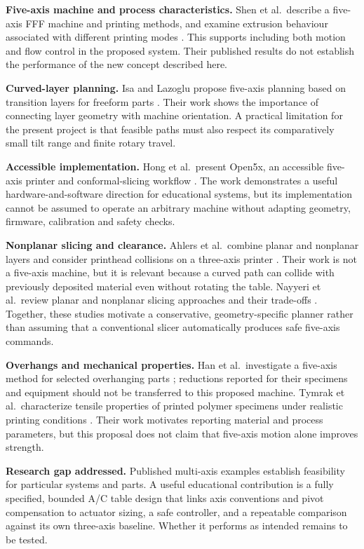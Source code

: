\documentclass[12pt,a4paper]{article}
\begin{document}
\textbf{Five-axis machine and process characteristics.} Shen et al.~describe a five-axis FFF machine and
  printing methods, and examine extrusion behaviour associated with different printing modes
  \cite{shen2018}. This supports including both motion and flow control in the proposed system. Their
  published results do not establish the performance of the new concept described here.

\textbf{Curved-layer planning.} Isa and Lazoglu propose five-axis planning based on transition layers for
  freeform parts \cite{isa2019}. Their work shows the importance of connecting layer geometry with
  machine orientation. A practical limitation for the present project is that feasible paths must also
  respect its comparatively small tilt range and finite rotary travel.

\textbf{Accessible implementation.} Hong et al.~present Open5x, an accessible five-axis printer and
  conformal-slicing workflow \cite{hong2022}. The work demonstrates a useful hardware-and-software
  direction for educational systems, but its implementation cannot be assumed to operate an arbitrary
  machine without adapting geometry, firmware, calibration and safety checks.

\textbf{Nonplanar slicing and clearance.} Ahlers et al.~combine planar and nonplanar layers and consider
  printhead collisions on a three-axis printer \cite{ahlers2019}. Their work is not a five-axis machine,
  but it is relevant because a curved path can collide with previously deposited material even without
  rotating the table. Nayyeri et al.~review planar and nonplanar slicing approaches and their trade-offs
  \cite{nayyeri2022}. Together, these studies motivate a conservative, geometry-specific planner rather
  than assuming that a conventional slicer automatically produces safe five-axis commands.

\textbf{Overhangs and mechanical properties.} Han et al.~investigate a five-axis method for selected
  overhanging parts \cite{han2025}; reductions reported for their specimens and equipment should not be
  transferred to this proposed machine. Tymrak et al.~characterize tensile properties of printed polymer
  specimens under realistic printing conditions \cite{tymrak2014}. Their work motivates reporting
  material and process parameters, but this proposal does not claim that five-axis motion alone improves
  strength.

\textbf{Research gap addressed.} Published multi-axis examples establish feasibility for particular
  systems and parts. A useful educational contribution is a fully specified, bounded A/C table design
  that links axis conventions and pivot compensation to actuator sizing, a safe controller, and a
  repeatable comparison against its own three-axis baseline. Whether it performs as intended remains to
  be tested.
\end{document}
